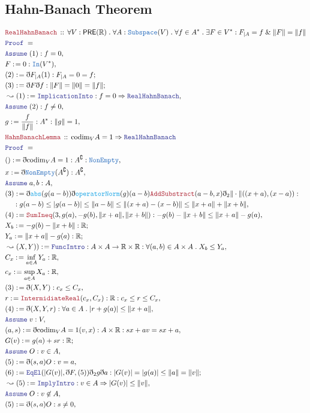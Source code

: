 \documentclass[12pt]{scrartcl}
\newcommand{\TYPE}[1]{\textcolor{NavyBlue}{\mathtt{#1}}}
\newcommand{\FUNC}[1]{\textcolor{Cerulean}{\mathtt{#1}}}
\newcommand{\LOGIC}[1]{\textcolor{Blue}{\mathtt{#1}}}
\newcommand{\THM}[1]{\textcolor{Maroon}{\mathtt{#1}}}
\renewcommand{\.}{\; . \;}
\newcommand{\de}{: \kern 0.1pc =}
\newcommand{\Theorem}[2]{& \THM{#1} \, :: \, #2 \\ & \Proof = \\ }
\newcommand{\NewLine}{\\ & \kern 1pc}
\newcommand{\Page}[1]{\begin{align*} #1 \end{align*} \newpage   }
\newcommand{ \bd }{ \ByDef }
\renewcommand{\And}{\; \& \;}
\newcommand{\Reals}{\mathbb{R} }
\renewcommand{\c}{\complement}
\newcommand{\Say}[3]{& #1 \de #2 : #3, \\}
\newcommand{\Conclude}[3]{& #1 \de #2 : #3; \\}
\newcommand{\Derive}[3]{& \leadsto #1 \de #2 : #3, \\}
\newcommand{\A}{\LOGIC{Assume} \;}
\newcommand{\Assume}[2]{& \A #1 : #2, \\}
\newcommand{\ByDef}{\eth}
\newcommand{\Proof}{\LOGIC{Proof} \; }
\newcommand{\PRE}{\mathsf{PRE}} %
\begin{document}
 \subsection{Hahn-Banach Theorem}
 \Page{
    \Theorem{RealHahnBanach}
    {\forall V : \PRE(\Reals) \. \forall A : \TYPE{Subspace}(V) \.
     \forall f \in A^*  \. \exists F \in V^* :  F_{|A} = f \And \| F \| = \| f \|    
     }
    \Assume{(1)}{f = 0}
    \Say{F}{0}{\TYPE{In}(V^*)}
    \Conclude{(2)}{ \bd F_{|A} (1) }{ F_{|A} = 0 = f }
    \Conclude{(3)}{ \bd F \bd f }{ \| F \| = \| 0 \| = \| f \| }
    \Derive{(1)}{ \LOGIC{ImplicationInto} }{ f = 0 \Rightarrow \LOGIC{RealHahnBanach}}
    \Assume{(2)}{ f \neq 0}
    \Say{g}{\frac{f}{\| f \|}}{ A^* : \|g\| = 1}
    \Theorem{HahnBanachLemma}{ \mathrm{codim}_V  A = 1 \Rightarrow  
     \LOGIC{RealHahnBanach} }
    \Say{()}{ \bd \mathrm{codim}_V  A =  1}{A^\c : \TYPE{NonEmpty}}
    \Say{x}{ \bd \TYPE{NonEmpty}(A^\c) }{A^\c}
    \Assume{a,b}{A}
    \Say{(3)}{ \bd \FUNC{abs}(g(a - b))\bd \FUNC{operatorNorm}(g)(a-b)\THM{AddSubstract}(a-b,x)
          \bd_2 \| \cdot \|((x + a), (x - a))     
      }{ \NewLine : g(a - b) \le |g(a - b)| \le  \| a - b \| \le \| (x + a) - (x -b) \| 
        \le  \| x + a  \| + \| x + b \| 
    }
   \Say{(4)}{\THM{SumIneq}(3,g(a), -g(b), \|x + a \|, \|x + b \|   )}{ -g(b) - \|x + b \| \le 
   \| x + a \| - g(a)}
   \Conclude{X_b}{ -g(b) - \|x + b \|   }{ \Reals }
   \Conclude{Y_a}{ \|x + a \| - g(a)}{\Reals}
   \Derive{(X,Y))}{\LOGIC{FuncIntro}}{A \times A \to \Reals \times \Reals : 
   \forall (a,b) \in A \times A \. X_b \le Y_a}
   \Say{C_x}{ \inf_{a \in A} Y_a}{\Reals}
   \Say{c_x}{ \sup_{a \in A} X_a}{\Reals}
   \Say{(3)}{ \bd(X,Y)}{c_x \le C_x}
   \Say{r}{ \THM{IntermidiateReal}(c_x,C_x)}{\Reals : c_x \le r \le C_x }
   \Say{(4)}{ \bd (X,Y,r)}{\forall a \in A \. |r + g(a)| \le \| x + a \|}
   \Assume{v}{V}
   \Say{(a,s)}{ \bd \mathrm{codim}_V  A = 1 (v, x) }{  A  \times \Reals : sx + a
      v = sx + a    
   }
   \Conclude{G(v)}{g(a) + sr}{\Reals}
   \Assume{O}{v \in A}
   \Say{(5)}{\bd (s,a)O }{ v = a}
   \Conclude{(6)}{ \LOGIC{EqEl}(|G(v)|, \bd F, (5))\bd_2 g \bd a }{| G(v)| = |g(a)| \le \| a \| = \| v \|}
   \Derive{(5)}{\LOGIC{ImplyIntro}}{ v \in A \Rightarrow |G(v)| \le \| v \| }
   \Assume{O}{ v \not \in A }
   \Say{(5)}{ \bd (s,a)O }{ s \neq 0 }
   }
\end{document}
